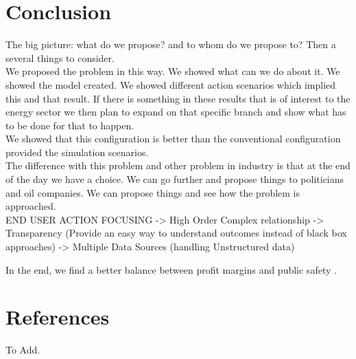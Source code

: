 \documentclass[12pt]{article}
\begin{document}
\section{Conclusion}
The big picture: what do we propose? and to whom do we propose to? Then a several things to consider. \\

We proposed the problem in this way. We showed what can we do about it. We showed the model created. We showed different action scenarios which implied this and that result. If there is something in these results that is of interest to the energy sector we then plan to expand on that specific branch and show what has to be done for that to happen.\\  

We showed that this configuration is better than the conventional configuration provided the simulation scenarios. \\

The difference with this problem and other problem in industry is that at the end of the day we have a choice. We can go further and propose things to politicians and oil companies. We can propose things and see how the problem is approached. \\

END USER ACTION FOCUSING -> High Order Complex relationship -> Transparency (Provide an easy way to understand outcomes  instead of black box approaches) -> Multiple Data Sources (handling Unstructured data) 

In the end, we find a better balance between profit margins and public safety . 

\section{References}
To Add. 
\end{document}
